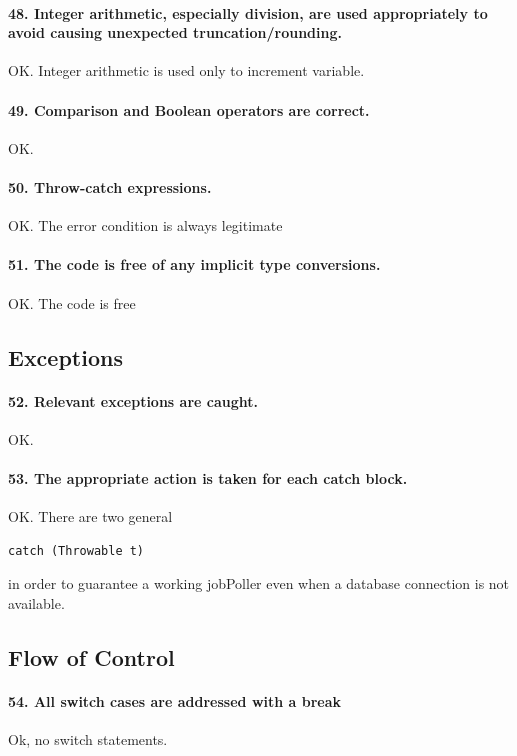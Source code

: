 \documentclass[english]{article}
\begin{document}
\paragraph{48. Integer arithmetic, especially division, are used appropriately to avoid causing unexpected truncation/rounding.}
OK. Integer arithmetic is used only to increment variable.

\paragraph{49. Comparison and Boolean operators are correct.}
OK.

\paragraph{50. Throw-catch expressions.}
OK. The error condition is always legitimate

\paragraph{51. The code is free of any implicit type conversions.}
OK. The code is free 
\subsection{Exceptions}

\paragraph{52. Relevant exceptions are caught.}
OK.
\paragraph{53. The appropriate action is taken for each catch block.}
OK. There are two general
\begin{lstlisting}
catch (Throwable t)
\end{lstlisting} in order to guarantee a working jobPoller even when a database connection is not available.

\subsection{Flow of Control}
\paragraph{54. All switch cases are addressed with a break}
Ok, no switch statements.
\end{document}
